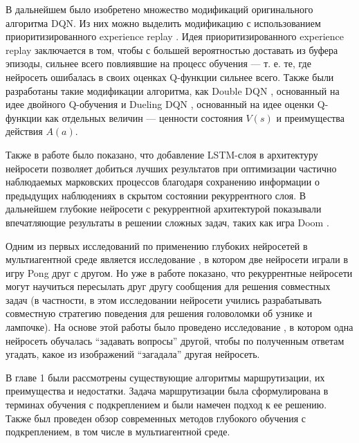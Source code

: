 \documentclass[specification,annotation,times]{itmo-student-thesis}
\theoremstyle{definition}
\begin{document}
В дальнейшем было изобретено множество модификаций оригинального алгоритма DQN.
Из них можно выделить модификацию с использованием приоритизированного
experience replay \cite{schaul2015prioritized}. Идея приоритизированного
experience replay заключается в том, чтобы с большей вероятностью доставать из
буфера эпизоды, сильнее всего повлиявшие на процесс обучения --- т. е. те,
где нейросеть ошибалась в своих оценках Q-функции сильнее всего.
Также были разработаны такие модификации алгоритма, как Double
DQN \cite{van2016deep}, основанный на идее двойного
Q-обучения \cite{hasselt2010double} и Dueling DQN \cite{wang2015dueling},
основанный на идее оценки Q-функции как отдельных величин --- ценности состояния
$V(s)$ и преимущества действия $A(a)$.

Также в работе \cite{hausknecht2015deep} было показано, что добавление
LSTM-слоя \cite{hochreiter1997long} в архитектуру нейросети позволяет добиться
лучших результатов при оптимизации частично наблюдаемых марковских процессов
благодаря сохранению информации о предыдущих наблюдениях в скрытом состоянии
рекуррентного слоя. В дальнейшем глубокие нейросети с рекуррентной архитектурой
показывали впечатляющие результаты в решении сложных задач, таких как игра
Doom \cite{lample2016playing}.

Одним из первых исследований по применению глубоких нейросетей в мультиагентной
среде является исследование \cite{tampuu2017multiagent}, в котором две нейросети
играли в игру Pong друг с другом. Но уже в работе \cite{foerster2016learning}
показано, что рекуррентные нейросети могут научиться пересылать друг другу сообщения для решения
совместных задач (в частности, в этом исследовании нейросети учились
разрабатывать совместную стратегию поведения для решения головоломки об узнике и
лампочке). На основе этой работы было проведено исследование
\cite{jorge2016learning}, в котором одна нейросеть обучалась
\enquote{задавать вопросы} другой, чтобы по полученным ответам угадать, какое из
изображений \enquote{загадала} другая нейросеть.

\chapterconclusion

В главе 1 были рассмотрены существующие алгоритмы маршрутизации, их преимущества
и недостатки. Задача маршрутизации была сформулирована в терминах обучения с
подкреплением и были намечен подход к ее решению. Также был проведен обзор
современных методов глубокого обучения с подкреплением, в том числе в
мультиагентной среде.

\finishrelatedwork
\end{document}
